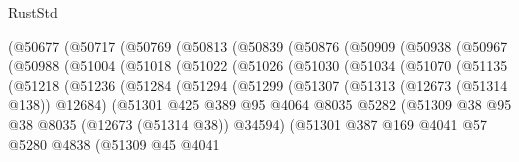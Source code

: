 \begin{lexlean}{RustStd}
\begin{coremodule}
{\begin{coremodule}
{{{{{{{{{{{{{{{{{{{{{{{{{{{{{{{{{{{{{{{{{{{{{{{{{{{{{{{{{{{{{{{{{{{{{{{{{{{{{{{{        (@50677
          (@50717
            (@50769
              (@50813
                (@50839
                  (@50876
                    (@50909
                      (@50938
                        (@50967
                          (@50988
                            (@51004
                              (@51018
                                (@51022
                                  (@51026
                                    (@51030
                                      (@51034
                                        (@51070
                                          (@51135
                                            (@51218
                                              (@51236
                                                (@51284
                                                  (@51294
                                                    (@51299
                                                      (@51307
                                                        (@51313 (@12673 (@51314 @138)) @12684)
                                                        (@51301
                                                          @425
                                                          @389
                                                          @95
                                                          @4064
                                                          @8035
                                                          @5282
                                                          (@51309
                                                            @38
                                                            @95
                                                            @38
                                                            @8035
                                                            (@12673 (@51314 @38))
                                                            @34594)
                                                          (@51301
                                                            @387
                                                            @169
                                                            @4041
                                                            @57
                                                            @5280
                                                            @4838
                                                            (@51309
                                                              @45
                                                              @4041
}}}}}}}}}}}}}}}}}}}}}}}}}}}}}}}}}}}}}}}}}}}}}}}}}}}}}}}}}}}}}}}}}}}}}}}}}}}}}}}}
\end{coremodule}}
\end{coremodule}
\end{lexlean}
